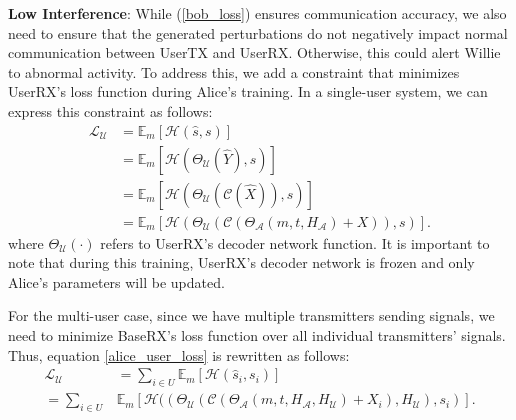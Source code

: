 
\textbf{Low Interference}: While (\ref{bob_loss}) ensures communication accuracy, we also need to ensure that the generated perturbations do not negatively impact normal communication between UserTX and UserRX. Otherwise, this could alert Willie to abnormal activity. To address this, we add a constraint that minimizes UserRX's loss function during Alice's training. In a single-user system, we can express this constraint as follows:
\begin{equation}
	\begin{aligned} \label{alice_user_loss}
	\mathcal{L}_{\mathcal{U}} & = \mathbb{E}_{m}[\mathcal{H}(\hat{s}, s)] \\
	& = \mathbb{E}_{m}[\mathcal{H}(\Theta_{\mathcal{U}}(\hat{Y}), s)] \\
	& = \mathbb{E}_{m}[\mathcal{H}(\Theta_{\mathcal{U}}(\mathcal{C}(\hat{X})), s)] \\
	& = \mathbb{E}_{m}[\mathcal{H}(\Theta_{\mathcal{U}}(\mathcal{C}(\Theta_{\mathcal{A}}(m, t, H_{\mathcal{A}}) + X)), s)].
	\end{aligned}
\end{equation}
where \(\Theta_{\mathcal{U}}(\cdot)\) refers to UserRX's decoder network function. It is important to note that during this training, UserRX's decoder network is frozen and only Alice's parameters will be updated.

For the multi-user case, since we have multiple transmitters sending signals, we need to minimize BaseRX's loss function over all individual transmitters' signals. Thus, equation \ref{alice_user_loss} is rewritten as follows:
\begin{equation}
	\begin{aligned} \label{multi_alice_user_loss}
		\mathcal{L}_{\mathcal{U}} & = \sum_{i \in U}\mathbb{E}_{m}[\mathcal{H}(\hat{s}_i, s_i)] \\
		= \sum_{i \in U} & 
			\mathbb{E}_{m}[\mathcal{H}
			((\Theta_{\mathcal{U}}(\mathcal{C}(\Theta_{\mathcal{A}}(m, t, H_{\mathcal{A}}, H_{\mathcal{U}}) + X_i),  H_{\mathcal{U}}), s_i)].
	\end{aligned}
\end{equation}

